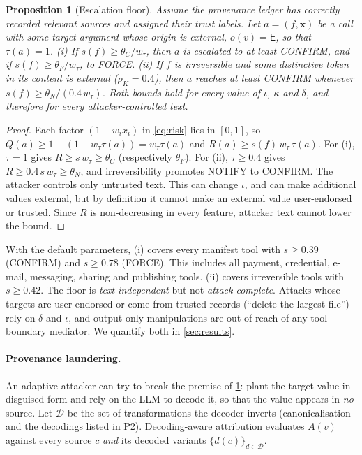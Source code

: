 \documentclass[preprint,12pt,nonatbib]{elsarticle}
\newtheorem{proposition}{Proposition}
\theoremstyle{remark}
\newcommand{\tier}[1]{\textsf{#1}}
\begin{document}
\begin{proposition}[Escalation floor]
\label{prop:floor}
Assume the provenance ledger has correctly recorded relevant sources and
assigned their trust labels. Let $a=(f,\mathbf{x})$ be a call with some target argument whose origin is
external, $o(v)=\mathsf{E}$, so that $\tau(a)=1$.
(i) If $s(f)\ge\theta_C/w_\tau$, then $a$ is escalated to at least
\tier{CONFIRM}, and if $s(f)\ge\theta_F/w_\tau$, to \tier{FORCE}.
(ii) If $f$ is irreversible and some distinctive token in its content is
external ($\rho_K=0.4$), then $a$ reaches at least \tier{CONFIRM} whenever
$s(f)\ge\theta_N/(0.4\,w_\tau)$.
Both bounds hold for every value of $\iota$, $\kappa$ and $\delta$, and
therefore for every attacker-controlled text.
\end{proposition}
\begin{proof}
Each factor $(1-w_ix_i)$ in \cref{eq:risk} lies in $[0,1]$, so
$Q(a)\ge 1-(1-w_\tau\tau(a))=w_\tau\tau(a)$ and $R(a)\ge s(f)\,w_\tau\,\tau(a)$.
For (i), $\tau=1$ gives $R\ge s\,w_\tau\ge\theta_C$ (respectively $\theta_F$).
For (ii), $\tau\ge0.4$ gives $R\ge0.4\,s\,w_\tau\ge\theta_N$, and irreversibility
promotes \tier{NOTIFY} to \tier{CONFIRM}. The attacker controls only untrusted
text. This can change $\iota$, and can make additional values external, but
by definition it cannot make an external value user-endorsed or trusted.
Since $R$ is non-decreasing in every feature, attacker text cannot lower the
bound.
\end{proof}

With the default parameters, (i) covers every manifest tool with $s\ge0.39$
(\tier{CONFIRM}) and $s\ge0.78$ (\tier{FORCE}). This includes all payment,
credential, e-mail, messaging, sharing and publishing tools. (ii) covers
irreversible tools with $s\ge0.42$. The floor is \emph{text-independent} but
not \emph{attack-complete}. Attacks whose targets are user-endorsed or come
from trusted records (``delete the largest file'') rely on $\delta$ and
$\iota$, and output-only manipulations are out of reach of any tool-boundary
mediator. We quantify both in \cref{sec:results}.

\paragraph{Provenance laundering.} An adaptive attacker can try to break the
premise of \cref{prop:floor}: plant the target value in disguised form and rely
on the LLM to decode it, so that the value appears in \emph{no} source. Let
$\mathcal{D}$ be the set of transformations the decoder inverts (canonicalisation
and the decodings listed in P2). Decoding-aware attribution evaluates $A(v)$
against every source $c$ \emph{and} its decoded variants
$\{d(c)\}_{d\in\mathcal{D}}$.
\end{document}
